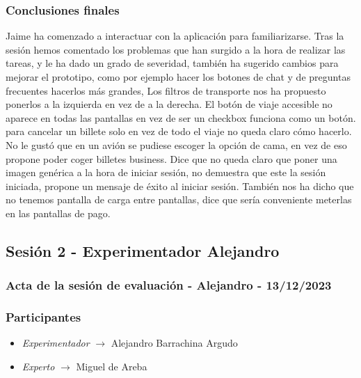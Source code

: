 \subsubsection{Conclusiones finales}
Jaime ha comenzado a interactuar con la aplicación para familiarizarse. Tras la sesión hemos comentado los problemas que han surgido 
a la hora de realizar las tareas, y le ha dado un grado de severidad, también ha sugerido cambios para mejorar el prototipo, como por ejemplo hacer los botones de 
chat y de preguntas frecuentes hacerlos más grandes, Los filtros de transporte nos ha propuesto ponerlos a la izquierda en vez de a la derecha. El botón de viaje 
accesible no aparece en todas las pantallas en vez de ser un checkbox funciona como un botón. para cancelar un billete solo en vez de todo el viaje no queda claro 
cómo hacerlo. No le gustó que en un avión se pudiese escoger la opción de cama, en vez de eso propone poder coger billetes business. Dice que no queda claro que 
poner una imagen genérica a la hora de iniciar sesión, no demuestra que este la sesión iniciada, propone un mensaje de éxito al iniciar sesión. También nos ha dicho 
que no tenemos pantalla de carga entre pantallas, dice que sería conveniente meterlas en las pantallas de pago.

\subsection{Sesión 2 - Experimentador Alejandro}
\subsubsection{Acta de la sesión de evaluación - Alejandro - 13/12/2023}
\subsubsection{Participantes}
\begin{itemize}
    \item \textit{Experimentador} $\rightarrow$ Alejandro Barrachina Argudo
    \item \textit{Experto} $\rightarrow$ Miguel de Areba
\end{itemize}

